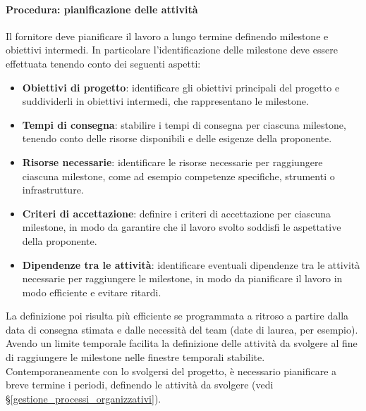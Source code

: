 \documentclass[a4paper,12pt]{article}
\begin{document}
\paragraph{Procedura: pianificazione delle attività}
Il fornitore deve pianificare il lavoro a lungo termine definendo milestone e
obiettivi intermedi.
In particolare l'identificazione delle milestone deve essere effettuata tenendo conto dei seguenti aspetti:
\begin{itemize}
    \item \textbf{Obiettivi di progetto}: identificare gli obiettivi principali del progetto e suddividerli in obiettivi intermedi, che rappresentano le milestone.
    \item \textbf{Tempi di consegna}: stabilire i tempi di consegna per ciascuna milestone, tenendo conto delle risorse disponibili e delle esigenze della proponente.
    \item \textbf{Risorse necessarie}: identificare le risorse necessarie per raggiungere ciascuna milestone, come ad esempio competenze specifiche, strumenti o infrastrutture.
    \item \textbf{Criteri di accettazione}: definire i criteri di accettazione per ciascuna milestone, in modo da garantire che il lavoro svolto soddisfi le aspettative della proponente.
    \item \textbf{Dipendenze tra le attività}: identificare eventuali dipendenze tra le attività necessarie per raggiungere le milestone, in modo da pianificare il lavoro in modo efficiente e evitare ritardi.
\end{itemize}
 La definizione poi risulta più efficiente se programmata a ritroso a partire dalla data di consegna stimata e dalle necessità del team (date di laurea, per esempio). Avendo un limite temporale facilita la definizione delle attività da svolgere al fine di raggiungere le milestone nelle finestre temporali stabilite.
Contemporaneamente con lo svolgersi del progetto, è necessario pianificare a
breve termine i periodi, definendo le attività da svolgere (vedi
§\ref{gestione_processi_organizzativi}).
\end{document}
